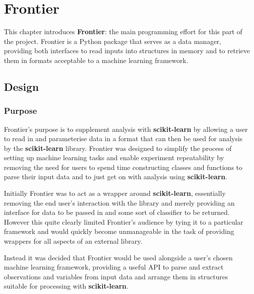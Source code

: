 \chapter{Frontier}
\ifpdf
    \graphicspath{{Chapter3/Figs/Raster/}{Chapter3/Figs/PDF/}{Chapter3/Figs/}}
\else
    \graphicspath{{Chapter3/Figs/Vector/}{Chapter3/Figs/}}
\fi


This chapter introduces \textbf{Frontier}: the main programming effort for this
part of the project. Frontier is a Python package that serves as a data manager,
providing both interfaces to read inputs into structures in memory and to
retrieve them in formats acceptable to a machine learning framework.

\section{Design}
\subsection{Purpose}

Frontier's purpose is to supplement analysis with \textbf{scikit-learn} by
allowing a user to read in and parameterise data in a format that can then be
used for analysis by the \textbf{scikit-learn} library.  Frontier was designed
to simplify the process of setting up machine learning tasks and enable
experiment repeatability by removing the need for users to spend time
constructing classes and functions to parse their input data and to just get on
with analysis using \textbf{scikit-learn}.

Initially Frontier was to act as a wrapper around \textbf{scikit-learn},
essentially removing the end user's interaction with the library and merely
providing an interface for data to be passed in and some sort of classifier to
be returned. However this quite clearly limited Frontier's audience by tying it
to a particular framework and would quickly become unmanageable in the task of
providing wrappers for all aspects of an external library.

Instead it was decided that Frontier would be used alongside a user's chosen
machine learning framework, providing a useful API to parse and extract
observations and variables from input data and arrange them in structures
suitable for processing with \textbf{scikit-learn}.

